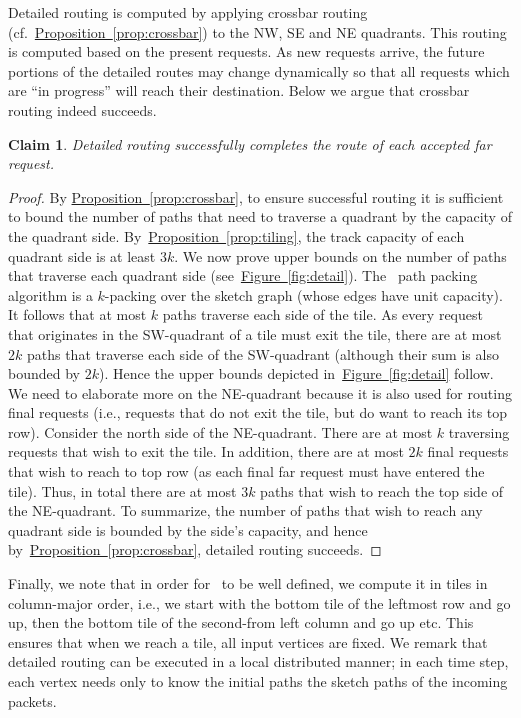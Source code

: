 \documentclass[11pt]{article}
\newtheorem{claim}[theorem]{Claim}
\newcommand{\namedref}[2]{\hyperref[#2]{#1~\ref*{#2}}}
\newcommand{\figref}[1]{\namedref{Figure}{#1}}
\newcommand{\propref}[1]{\namedref{Proposition}{#1}}
\newcommand{\route}{\text{\sc{ipp}}\xspace}
\newcommand{\IPP}{\route}
\newcommand{\detailedroute}{\text{\sc{detailed-route}}}
\newenvironment{proof sketch}[1]{\noindent {\emph{Proof sketch of #1:}}}{\hfill \qed}
\begin{document}
Detailed routing is computed by applying crossbar routing (cf.\
\propref{prop:crossbar}) to the NW, SE and NE quadrants. This routing is computed
based on the present requests.  As new requests arrive, the future portions of the
detailed routes may change dynamically so that all requests which are ``in
progress'' will reach their destination. Below we argue that crossbar routing indeed succeeds.
\begin{claim}
Detailed routing successfully completes the route of each accepted far request.
\end{claim}
\begin{proof}
By \propref{prop:crossbar}, to ensure successful routing
it is sufficient to bound the number of paths
that need to traverse a quadrant by the capacity of the
quadrant side.
  By~\propref{prop:tiling}, the track capacity of each quadrant side
  is at least $3k$.  We now prove upper bounds on the number of paths
  that traverse each quadrant side (see~\figref{fig:detail}).  The
  \IPP\ path packing algorithm is a $k$-packing over the sketch graph
  (whose edges have unit capacity). It follows that at most $k$ paths
  traverse each side of the tile.  As every request that originates in
  the SW-quadrant of a tile must exit the tile, there are at most $2k$
  paths that traverse each side of the SW-quadrant (although their sum
  is also bounded by $2k$).  Hence the upper bounds depicted
  in~\figref{fig:detail} follow. We need to elaborate more on the
  NE-quadrant because it is also used for routing final requests
  (i.e., requests that do not exit the tile, but do want to reach its
  top row). Consider the north side of the NE-quadrant. There are at
  most $k$ traversing requests that wish to exit the tile. In
  addition, there are at most $2k$ final requests that wish to reach
  to top row (as each final far request must have entered the
  tile). Thus, in total there are at most $3k$ paths that wish to
  reach the top side of the NE-quadrant. To summarize, the number of
  paths that wish to reach any quadrant side is bounded by the side's
  capacity, and hence by~\propref{prop:crossbar}, detailed routing
  succeeds.
\end{proof}

Finally, we note that in order for \detailedroute\ to be well defined, we compute it
in tiles in column-major order, i.e., we start with the bottom tile of the leftmost
row and go up, then the bottom tile of the second-from left column and go up etc.
This ensures that when we reach a tile, all input vertices are fixed. We remark that
detailed routing can be executed in a local distributed manner; in each time step,
each vertex needs only to know the initial paths the sketch paths of the incoming
packets.
\end{document}
